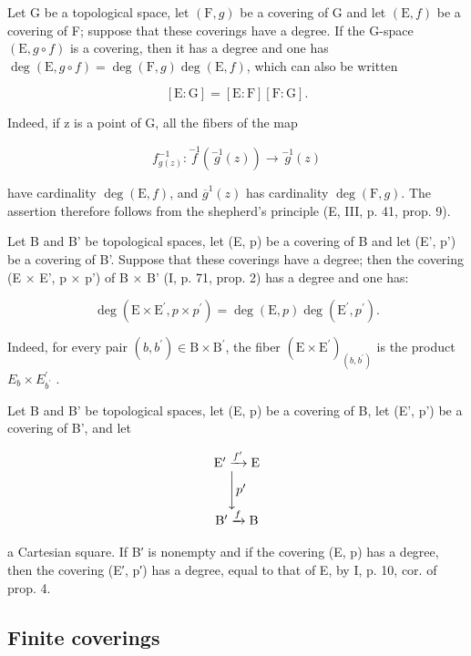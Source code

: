 Let G be a topological space, let \((\mathrm{F}, g)\) be a covering of G and let \((\mathrm{E}, f)\) be a covering of F; suppose that these coverings have a degree. If the G-space \((\mathrm{E}, g \circ f)\) is a covering, then it has a degree and one has \(\deg(\mathrm{E}, g \circ f) = \deg(\mathrm{F}, g) \deg(\mathrm{E}, f)\), which can also be written

\[
[ \mathrm{E}: \mathrm{G} ] = [ \mathrm{E}: \mathrm{F} ] [ \mathrm{F}: \mathrm{G} ].
\]

Indeed, if z is a point of G, all the fibers of the map

\[
f _ {g (z)} ^ {- 1}: \stackrel {{- 1}} {{f}} (\stackrel {{- 1}} {{g}} (z)) \to \stackrel {{- 1}} {{g}} (z)
\]

have cardinality \(\deg(\mathrm{E}, f)\), and \(\overline{g}^1(z)\) has cardinality \(\deg(\mathrm{F}, g)\). The assertion therefore follows from the shepherd's principle (E, III, p. 41, prop. 9).

Let B and B' be topological spaces, let (E, p) be a covering of B and let (E', p') be a covering of B'. Suppose that these coverings have a degree; then the covering (E × E', p × p') of B × B' (I, p. 71, prop. 2) has a degree and one has:

\[
\deg (\mathrm{E} \times \mathrm{E} ^ {\prime}, p \times p ^ {\prime}) = \deg (\mathrm{E}, p) \deg (\mathrm{E} ^ {\prime}, p ^ {\prime}).
\]

Indeed, for every pair \((b,b^{\prime})\in\mathrm{B}\times\mathrm{B}^{\prime}\), the fiber \((\mathrm{E}\times\mathrm{E}^{\prime})_{(b,b^{\prime})}\) is the product \(E_{b}\times E_{b^{\prime}}^{\prime}\) .

Let B and B' be topological spaces, let (E, p) be a covering of B, let (E', p') be a covering of B', and let

\[
\begin{array}{c} \mathrm{E} ^ {\prime} \xrightarrow {f ^ {\prime}} \mathrm{E} \\ \Biggl \downarrow p ^ {\prime} \\ \mathrm{B} ^ {\prime} \xrightarrow {f} \mathrm{B} \end{array}
\]

a Cartesian square. If B′ is nonempty and if the covering (E, p) has a degree, then the covering (E′, p′) has a degree, equal to that of E, by I, p. 10, cor. of prop. 4.

\subsection{Finite coverings}

